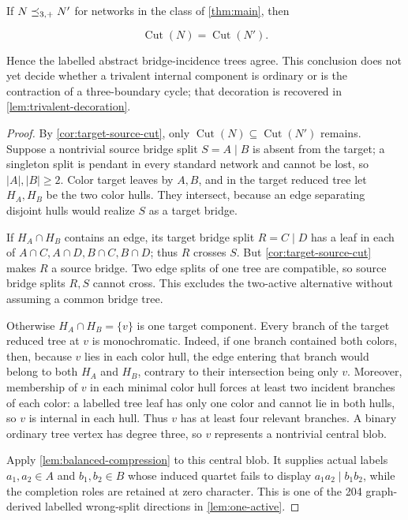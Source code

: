 \begin{theorem}
\label{thm:cut-transfer}
If \(N\preceq_{3,+} N'\) for networks in the class of \cref{thm:main}, then

\[
 \operatorname{Cut}(N)=\operatorname{Cut}(N').
\]

Hence the labelled abstract bridge-incidence trees agree.  This conclusion
does not yet decide whether a trivalent internal component is ordinary or is
the contraction of a three-boundary cycle; that decoration is recovered in
\cref{lem:trivalent-decoration}.
\end{theorem}

\begin{proof}
By \cref{cor:target-source-cut}, only
\(\operatorname{Cut}(N)\subseteq\operatorname{Cut}(N')\) remains.  Suppose a
nontrivial source bridge split \(S=A\mid B\) is absent from the target; a
singleton split is pendant in every standard network and cannot be lost, so
\(|A|,|B|\ge2\).
Color target leaves by \(A,B\), and in the target reduced tree let \(H_A,H_B\)
be the two color hulls.  They intersect, because an edge separating disjoint
hulls would realize \(S\) as a target bridge.

If \(H_A\cap H_B\) contains an edge, its target bridge split \(R=C\mid D\)
has a leaf in each of
\(A\cap C,A\cap D,B\cap C,B\cap D\); thus \(R\) crosses \(S\).  But
\cref{cor:target-source-cut} makes \(R\) a source bridge.  Two edge splits of
one tree are compatible, so source bridge splits \(R,S\) cannot cross.  This
excludes the two-active alternative without assuming a common bridge tree.

Otherwise \(H_A\cap H_B=\{v\}\) is one target component.  Every branch of
the target reduced tree at \(v\) is monochromatic.  Indeed, if one branch
contained both colors, then, because \(v\) lies in each color hull, the edge
entering that branch would belong to both \(H_A\) and \(H_B\), contrary to
their intersection being only \(v\).  Moreover, membership of \(v\) in each
minimal color hull forces at least two incident branches of each color: a
labelled tree leaf has only one color and cannot lie in both hulls, so \(v\)
is internal in each hull.
Thus \(v\) has at least four relevant branches.  A binary ordinary tree
vertex has degree three, so \(v\) represents a nontrivial central blob.

Apply \cref{lem:balanced-compression} to this central blob.  It supplies
actual labels \(a_1,a_2\in A\) and \(b_1,b_2\in B\) whose induced quartet
fails to display \(a_1a_2\mid b_1b_2\), while the completion roles are
retained at zero character.  This is one of the 204 graph-derived labelled
wrong-split directions in \cref{lem:one-active}.


\end{proof}
